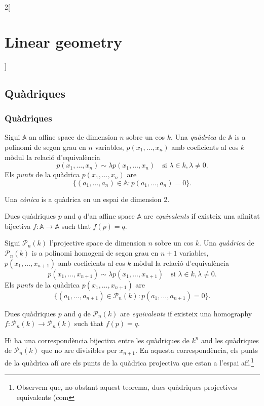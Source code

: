 \documentclass[class=article,10pt,crop=false]{standalone}
\begin{document}
\begin{multicols}{2}[\section{Linear geometry}]
\subsection{Quàdriques}
\subsubsection{Quàdriques}
\begin{definition}
Sigui $\mathbb{A}$ an affine space de dimension $n$ sobre un cos $k$. Una \textit{quàdrica} de $\mathbb{A}$ is a polinomi de segon grau en $n$ variables, $p(x_1,\ldots,x_n)$ amb coeficients al cos $k$ mòdul la relació d'equivalència $$p(x_1,\ldots,x_n)\sim\lambda p(x_1,\ldots,x_n)\quad\text{si }\lambda\in k,\lambda\ne0.$$ Els \textit{punts} de la quàdrica $p(x_1,\ldots,x_n)$ are $$\{(a_1,\ldots,a_n)\in\mathbb{A}:p(a_1,\ldots,a_n)=0\}.$$
\end{definition}
\begin{definition}
Una \textit{cònica} is a quàdrica en un espai de dimension 2.
\end{definition}
\begin{definition}
Dues quàdriques $p$ and $q$ d'an affine space $\mathbb{A}$ are \textit{equivalents} if existeix una afinitat bijectiva $f:\mathbb{A}\rightarrow\mathbb{A}$ such that $f(p)=q$.
\end{definition}
\begin{definition}
Sigui $\mathcal{P}_n(k)$ l'projective space de dimension $n$ sobre un cos $k$. Una \textit{quàdrica} de $\mathcal{P}_n(k)$ is a polinomi homogeni de segon grau en $n+1$ variables, $p(x_1,\ldots,x_{n+1})$ amb coeficients al cos $k$ mòdul la relació d'equivalència $$p(x_1,\ldots,x_{n+1})\sim\lambda p(x_1,\ldots,x_{n+1})\quad\text{si }\lambda\in k,\lambda\ne0.$$ Els \textit{punts} de la quàdrica $p(x_1,\ldots,x_{n+1})$ are $$\{(a_1,\ldots,a_{n+1})\in\mathcal{P}_n(k):p(a_1,\ldots,a_{n+1})=0\}.$$
\end{definition}
\begin{definition}
Dues quàdriques $p$ and $q$ de $\mathcal{P}_n(k)$ are \textit{equivalents} if existeix una homography $f:\mathcal{P}_n(k)\rightarrow\mathcal{P}_n(k)$ such that $f(p)=q$.
\end{definition}
\begin{theorem}
Hi ha una correspondència bijectiva entre les quàdriques de $k^n$ and les quà\-dri\-ques de $\mathcal{P}_n(k)$ que no are divisibles per $x_{n+1}$. En aquesta correspondència, els punts de la quàdrica afí are els punts de la quàdrica projectiva que estan a l’espai afí.\footnote{Observem que, no obstant aquest teorema, dues quàdriques projectives equivalents (com
}
\end{theorem}
\end{multicols}
\end{document}
